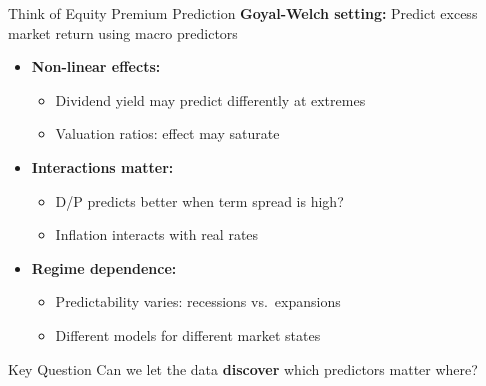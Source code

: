 \documentclass[10pt]{beamer}
\newcommand{\highlight}[1]{\textcolor{AccentOrange}{\textbf{#1}}}
\begin{document}
\begin{frame}{Think of Equity Premium Prediction}
  \textbf{Goyal-Welch setting:} Predict excess market return using macro predictors

  \vspace{0.5em}
  \begin{itemize}
    \item \textbf{Non-linear effects:}
    \begin{itemize}
      \item Dividend yield may predict differently at extremes
      \item Valuation ratios: effect may saturate
    \end{itemize}

    \vspace{0.5em}
    \item \textbf{Interactions matter:}
    \begin{itemize}
      \item D/P predicts better when term spread is high?
      \item Inflation interacts with real rates
    \end{itemize}

    \vspace{0.5em}
    \item \textbf{Regime dependence:}
    \begin{itemize}
      \item Predictability varies: recessions vs.\ expansions
      \item Different models for different market states
    \end{itemize}
  \end{itemize}

  \vspace{0.5em}
  \begin{block}{Key Question}
    Can we let the data \highlight{discover} which predictors matter where?
  \end{block}
\end{frame}

\end{document}
